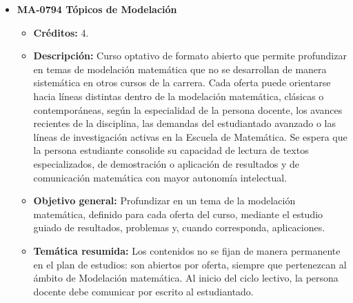 \begin{itemize}[leftmargin=1.3em, itemsep=10pt, topsep=4pt, label={\color{Azul-UCR}$\blacksquare$}]
\item {\color{Azul-UCR}\textbf{MA-0794 Tópicos de Modelación}}\par\nopagebreak\smallskip
\begin{itemize}[leftmargin=1.1em, itemsep=3pt, topsep=2pt, parsep=2pt, label={\textendash}]
\item \textbf{Créditos:} 4.
\item \textbf{Descripción:} Curso optativo de formato abierto que permite profundizar en temas de modelación matemática que no se desarrollan de manera sistemática en otros cursos de la carrera. Cada oferta puede orientarse hacia líneas distintas dentro de la modelación matemática, clásicas o contemporáneas, según la especialidad de la persona docente, los avances recientes de la disciplina, las demandas del estudiantado avanzado o las líneas de investigación activas en la Escuela de Matemática. Se espera que la persona estudiante consolide su capacidad de lectura de textos especializados, de demostración o aplicación de resultados y de comunicación matemática con mayor autonomía intelectual.
\item \textbf{Objetivo general:} Profundizar en un tema de la modelación matemática, definido para cada oferta del curso, mediante el estudio guiado de resultados, problemas y, cuando corresponda, aplicaciones.
\item \textbf{Temática resumida:} Los contenidos no se fijan de manera permanente en el plan de estudios: son abiertos por oferta, siempre que pertenezcan al ámbito de Modelación matemática. Al inicio del ciclo lectivo, la persona docente debe comunicar por escrito al estudiantado.
\end{itemize}


\end{itemize}
